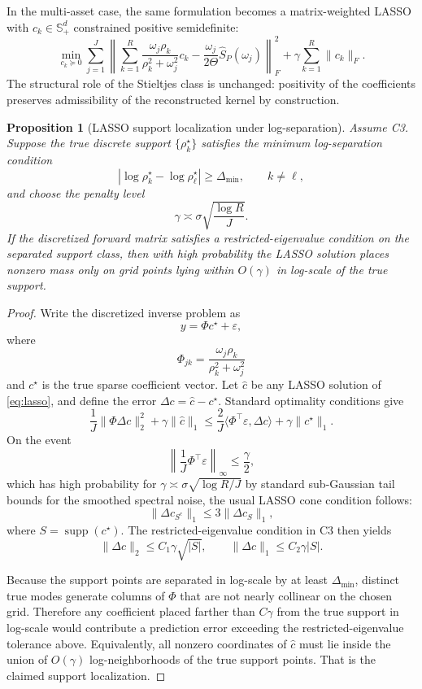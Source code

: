 \documentclass[11pt]{article}
\newtheorem{proposition}[theorem]{Proposition}
\newcommand{\REV}{}
\begin{document}
In the multi-asset case, the same formulation becomes a matrix-weighted LASSO with $c_k\in\mathbb{S}_+^d$ constrained positive semidefinite:
\[
  \min_{c_k\succeq 0}
  \sum_{j=1}^J
  \left\|
    \sum_{k=1}^R \frac{\omega_j\rho_k}{\rho_k^2+\omega_j^2}c_k
    -\frac{\omega_j}{2\Theta}\widehat{S}_P(\omega_j)
  \right\|_F^2
  +\gamma\sum_{k=1}^R \|c_k\|_F.
\]
The structural role of the Stieltjes class is unchanged: positivity of the coefficients preserves admissibility of the reconstructed kernel by construction.

\begin{proposition}[LASSO support localization under log-separation]\label{prop:lasso-support}\REV
Assume C3. Suppose the true discrete support $\{\rho_k^\star\}$ satisfies the minimum log-separation condition
\[
  |\log \rho_k^\star-\log \rho_\ell^\star|\ge \Delta_{\min},
  \qquad k\neq \ell,
\]
and choose the penalty level
\[
  \gamma\asymp \sigma\sqrt{\frac{\log R}{J}}.
\]
If the discretized forward matrix satisfies a restricted-eigenvalue condition on the separated support class, then with high probability the LASSO solution places nonzero mass only on grid points lying within $O(\gamma)$ in log-scale of the true support.
\end{proposition}

\begin{proof}
\REV
Write the discretized inverse problem as
\[
  y=\Phi c^\star+\varepsilon,
\]
where
\[
  \Phi_{jk}=\frac{\omega_j\rho_k}{\rho_k^2+\omega_j^2}
\]
and $c^\star$ is the true sparse coefficient vector. Let $\widehat c$ be any LASSO solution of \cref{eq:lasso}, and define the error $\Delta c=\widehat c-c^\star$. Standard optimality conditions give
\[
  \frac{1}{J}\|\Phi \Delta c\|_2^2+\gamma\|\widehat c\|_1
  \le
  \frac{2}{J}\langle \Phi^\top \varepsilon,\Delta c\rangle+\gamma\|c^\star\|_1.
\]
On the event
\[
  \left\|\frac{1}{J}\Phi^\top \varepsilon\right\|_\infty\le \frac{\gamma}{2},
\]
which has high probability for $\gamma\asymp \sigma\sqrt{\log R/J}$ by standard sub-Gaussian tail bounds for the smoothed spectral noise, the usual LASSO cone condition follows:
\[
  \|\Delta c_{S^c}\|_1\le 3\|\Delta c_S\|_1,
\]
where $S=\operatorname{supp}(c^\star)$. The restricted-eigenvalue condition in C3 then yields
\[
  \|\Delta c\|_2\le C_1 \gamma \sqrt{|S|},
  \qquad
  \|\Delta c\|_1\le C_2 \gamma |S|.
\]

Because the support points are separated in log-scale by at least $\Delta_{\min}$, distinct true modes generate columns of $\Phi$ that are not nearly collinear on the chosen grid. Therefore any coefficient placed farther than $C\gamma$ from the true support in log-scale would contribute a prediction error exceeding the restricted-eigenvalue tolerance above. Equivalently, all nonzero coordinates of $\widehat c$ must lie inside the union of $O(\gamma)$ log-neighborhoods of the true support points. That is the claimed support localization.
\end{proof}
\end{document}
